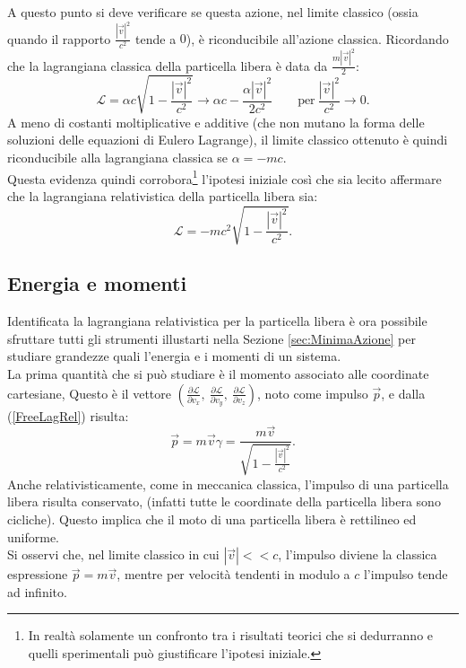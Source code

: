 A questo punto si deve verificare se questa azione, nel limite classico (ossia quando il rapporto $\frac{|\vec{v}|^2}{c^2}$ tende a $0$), è riconducibile all'azione classica. Ricordando che la lagrangiana classica della particella libera è data da $\frac{m|\vec{v}|^2}{2} $:
\begin{equation*}
    \mathcal{L} =\alpha c \sqrt{1-\frac{|\vec{v}|^2}{c^2}}\longrightarrow \alpha c - \frac{\alpha |\vec{v}|^2}{2c^2}\qquad \text{per}\ \frac{|\vec{v}|^2}{c^2}\rightarrow 0.
\end{equation*}
A meno di costanti moltiplicative e additive (che non mutano la forma delle soluzioni delle equazioni di Eulero Lagrange), il limite classico ottenuto è quindi riconducibile alla lagrangiana classica se $\alpha=-mc$.\\
Questa evidenza quindi corrobora\footnote{In realtà solamente un confronto tra i risultati teorici che si dedurranno e quelli sperimentali può giustificare l'ipotesi iniziale.} l'ipotesi iniziale così che sia lecito affermare che la lagrangiana relativistica della particella libera sia:
\begin{equation}\label{FreeLagRel}
    \mathcal{L} = -mc^2\sqrt{1-\frac{|\vec{v}|^2}{c^2}}.
\end{equation}
\subsection{Energia e momenti}\label{sec:LagRelEnMo}
Identificata la lagrangiana relativistica per la particella libera è ora possibile sfruttare tutti gli strumenti illustarti nella Sezione \ref{sec:MinimaAzione} per studiare grandezze quali l'energia e i momenti di un sistema.\\

La prima quantità che si può studiare è il momento associato alle coordinate cartesiane, Questo è il vettore  $(\frac{\partial \mathcal{L} }{\partial v_x},\ \frac{\partial \mathcal{L} }{\partial v_y},\ \frac{\partial \mathcal{L} }{\partial v_z})$, noto come impulso $\vec p$, e dalla (\ref{FreeLagRel}) risulta:
\begin{equation}
    \vec{p}=m\vec{v}\gamma=\frac{m\vec{v}}{\sqrt{1-\frac{|\vec{v}|^2}{c^2}}}.
    \label{impulsoRel}
\end{equation}
Anche relativisticamente, come in meccanica classica, l'impulso di una particella libera risulta conservato, (infatti tutte le coordinate della particella libera sono cicliche). Questo implica che il moto di una particella libera è rettilineo ed uniforme.\\
Si osservi che, nel limite classico in cui $|\vec{v}|<<c$, l'impulso diviene la classica espressione $\vec p=m\vec v$, mentre per velocità tendenti in modulo a $c$ l'impulso tende ad infinito.\\

